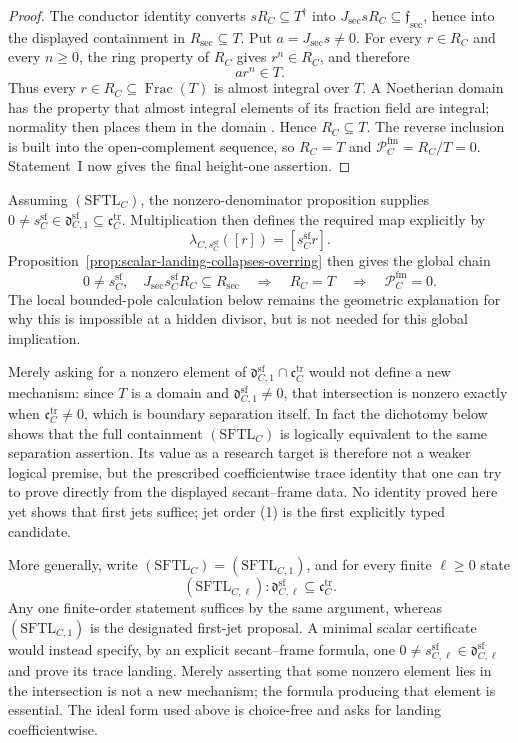 \documentclass[11pt]{article}
\theoremstyle{remark}
\theoremstyle{definition}
\DeclareMathOperator{\Frac}{Frac}
\begin{document}
\begin{proof}
The conductor identity converts \(sR_C\subseteq T^\dagger\) into
\(J_{\mathrm{sec}}sR_C\subseteq\mathfrak f_{\mathrm{sec}}\), hence into
the displayed containment in \(R_{\mathrm{sec}}\subseteq T\).  Put
\(a=J_{\mathrm{sec}}s\neq0\).  For every \(r\in R_C\) and every
\(n\geq0\), the ring property of \(R_C\) gives \(r^n\in R_C\), and
therefore
\[
  ar^n\in T.
\]
Thus every \(r\in R_C\subseteq\Frac(T)\) is almost integral over \(T\).
A Noetherian domain has the property that almost integral elements of its
fraction field are integral; normality then places them in the domain
\cite{StacksAlmostIntegral}.  Hence \(R_C\subseteq T\).  The reverse
inclusion is built into the open-complement sequence, so \(R_C=T\) and
\(\mathcal P_C^{\mathrm{fm}}=R_C/T=0\).  Statement~I now gives the final
height-one assertion.
\end{proof}

Assuming \((\mathrm{SFTL}_C)\), the nonzero-denominator proposition supplies
\(0\neq s_C^{\mathrm{sf}}\in\mathfrak d_{C,1}^{\mathrm{sf}}\subseteq
\mathfrak c_C^{\mathrm{tr}}\).  Multiplication then defines the required map
explicitly by
\[
  \lambda_{C,s_C^{\mathrm{sf}}}([r])=[s_C^{\mathrm{sf}}r].
\]
Proposition~\ref{prop:scalar-landing-collapses-overring} then gives the
global chain
\[
  0\neq s_C^{\mathrm{sf}},\quad
  J_{\mathrm{sec}}s_C^{\mathrm{sf}}R_C\subseteq R_{\mathrm{sec}}
  \quad\Longrightarrow\quad
  R_C=T
  \quad\Longrightarrow\quad
  \mathcal P_C^{\mathrm{fm}}=0.
\]
The local bounded-pole calculation below remains the geometric explanation
for why this is impossible at a hidden divisor, but is not needed for this
global implication.

Merely asking for a nonzero element of
\(\mathfrak d_{C,1}^{\mathrm{sf}}\cap\mathfrak c_C^{\mathrm{tr}}\) would
not define a new mechanism: since \(T\) is a domain and
\(\mathfrak d_{C,1}^{\mathrm{sf}}\neq0\), that intersection is nonzero
exactly when \(\mathfrak c_C^{\mathrm{tr}}\neq0\), which is boundary
separation itself.  In fact the dichotomy below shows that the full
containment \((\mathrm{SFTL}_C)\) is logically equivalent to the same
separation assertion.  Its value as a research target is therefore not a
weaker logical premise, but the prescribed coefficientwise trace identity
that one can try to prove directly from the displayed secant--frame data.
No identity proved here yet shows that first jets suffice; jet order (1) is
the first explicitly typed candidate.

More generally, write
\((\mathrm{SFTL}_C)=(\mathrm{SFTL}_{C,1})\), and for every finite
\(\ell\geq0\) state
\[
  (\mathrm{SFTL}_{C,\ell})\colon
  \mathfrak d_{C,\ell}^{\mathrm{sf}}
  \subseteq\mathfrak c_C^{\mathrm{tr}}.
\]
Any one finite-order statement suffices by the same argument, whereas
\((\mathrm{SFTL}_{C,1})\) is the designated first-jet proposal.  A minimal scalar
certificate would instead specify, by an explicit secant--frame formula, one
\(0\neq s_{C,\ell}^{\mathrm{sf}}\in
\mathfrak d_{C,\ell}^{\mathrm{sf}}\) and prove its trace landing.  Merely
asserting that some nonzero element lies in the intersection is not a new
mechanism; the formula producing that element is essential.  The ideal form
used above is choice-free and asks for landing coefficientwise.
\end{document}
